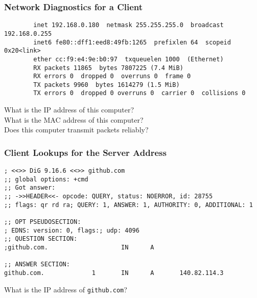 \documentclass[14pt,aspectratio=169]{beamer}
\begin{document}
%
\begin{frame}[fragile]
  \frametitle{Network Diagnostics for a Client}
  \normalsize
  \hspace*{-.65in}
  \begin{minipage}{6in}
    \vspace*{.25in}
    \begin{verbatim}
        inet 192.168.0.180  netmask 255.255.255.0  broadcast 192.168.0.255
        inet6 fe80::dff1:eed8:49fb:1265  prefixlen 64  scopeid 0x20<link>
        ether cc:f9:e4:9e:b0:97  txqueuelen 1000  (Ethernet)
        RX packets 11865  bytes 7807225 (7.4 MiB)
        RX errors 0  dropped 0  overruns 0  frame 0
        TX packets 9960  bytes 1614279 (1.5 MiB)
        TX errors 0  dropped 0 overruns 0  carrier 0  collisions 0
    \end{verbatim}
  \end{minipage}
  \vspace*{.25in}
  \begin{center}
    \normalsize \noindent What is the IP address of this computer? \\
    \normalsize \noindent What is the MAC address of this computer? \\
    \normalsize \noindent Does this computer transmit packets reliably? \\
  \end{center}
\end{frame}

%
\begin{frame}[fragile]
  \frametitle{Client Lookups for the Server Address}
  \normalsize
  \hspace*{-.2in}
  \begin{minipage}{6in}
    \vspace*{.15in}
    \begin{verbatim}
; <<>> DiG 9.16.6 <<>> github.com
;; global options: +cmd
;; Got answer:
;; ->>HEADER<<- opcode: QUERY, status: NOERROR, id: 28755
;; flags: qr rd ra; QUERY: 1, ANSWER: 1, AUTHORITY: 0, ADDITIONAL: 1

;; OPT PSEUDOSECTION:
; EDNS: version: 0, flags:; udp: 4096
;; QUESTION SECTION:
;github.com.                    IN      A

;; ANSWER SECTION:
github.com.             1       IN      A       140.82.114.3
    \end{verbatim}
  \end{minipage}
  \vspace*{0in}
  \begin{center}
    \normalsize \noindent What is the IP address of {\tt github.com}? \\
  \end{center}
\end{frame}
\end{document}
